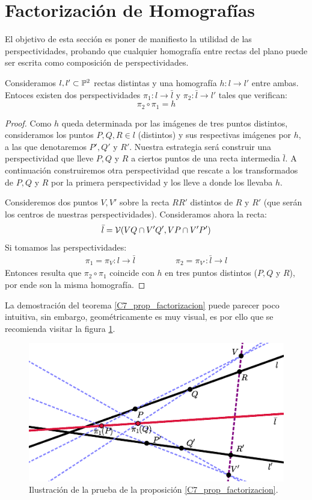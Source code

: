 \section{Factorización de Homografías}
\label{C7_factorizacion}
El objetivo de esta sección es poner de manifiesto la utilidad de las perspectividades, probando que cualquier homografía entre rectas del plano puede ser escrita como composición de perspectividades.
\begin{prop}
	\label{C7_prop_factorizacion}
	Consideramos $l,l'\subset\mathbb{P}^2$ rectas distintas y una homografía $h:l\to l'$ entre ambas. Entoces existen dos perspectividades $\pi_1:l\to\bar{l}$ y $\pi_2:\bar{l}\to l'$ tales que verifican:
	\[\pi_2\circ\pi_1=h\]
\end{prop}
\begin{proof}
	Como $h$ queda determinada por las imágenes de tres puntos distintos, consideramos los puntos $P,Q,R\in l$ (distintos) y sus respectivas imágenes por $h$, a las que denotaremos $P',Q'$ y $R'$. Nuestra estrategia será construir una perspectividad que lleve $P,Q$ y $R$ a ciertos puntos de una recta intermedia $\bar{l}$. A continuación construiremos otra perspectividad que rescate a los transformados de $P,Q$ y $R$ por la primera perspectividad y los lleve a donde los llevaba $h$.
	
	Consideremos dos puntos $V,V'$ sobre la recta $RR'$ distintos de $R$ y $R'$ (que serán los centros de nuestras perspectividades). Consideramos ahora la recta:
	\[\bar{l}=\mathcal{V}(VQ\cap V'Q', VP\cap V'P')\]
	Si tomamos las perspectividades:
	\[\begin{array}{cc}
	\pi_1=\pi_V:l\to\bar{l} \qquad&\qquad \pi_2=\pi_{V'}:\bar{l}\to l
	\end{array}\]
	Entonces resulta que $\pi_2\circ\pi_1$ coincide con $h$ en tres puntos distintos ($P,Q$ y $R$), por ende son la misma homografía.
\end{proof}
La demostración del teorema \ref{C7_prop_factorizacion} puede parecer poco intuitiva, sin embargo, geométricamente es muy visual, es por ello que se recomienda visitar la figura \ref{C7_img_factorizacion}.
\begin{figure}[h]
	\centering
	\includegraphics[scale=.4]{Graficos/factorizacion.eps}
	\caption{Ilustración de la prueba de la proposición \ref{C7_prop_factorizacion}.}
	\label{C7_img_factorizacion}
\end{figure}
